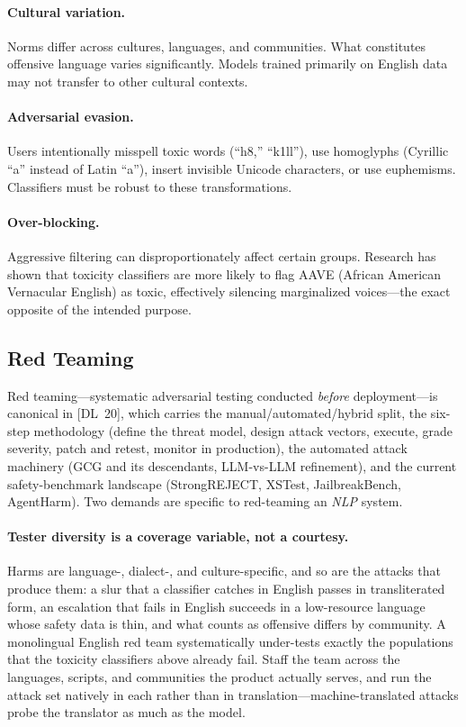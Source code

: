 \paragraph{Cultural variation.}
Norms differ across cultures, languages, and communities.  What constitutes
offensive language varies significantly.  Models trained primarily on English
data may not transfer to other cultural contexts.

\paragraph{Adversarial evasion.}
Users intentionally misspell toxic words (``h8,'' ``k1ll''), use homoglyphs
(Cyrillic ``a'' instead of Latin ``a''), insert invisible Unicode characters,
or use euphemisms.  Classifiers must be robust to these transformations.

\paragraph{Over-blocking.}
Aggressive filtering can disproportionately affect certain groups.  Research
has shown that toxicity classifiers are more likely to flag AAVE (African
American Vernacular English) as toxic, effectively silencing marginalized
voices---the exact opposite of the intended purpose.

\subsection{Red Teaming}
\label{sec:red_teaming}

Red teaming---systematic adversarial testing conducted \emph{before}
deployment---is canonical in [DL~20], which carries the
manual/automated/hybrid split, the six-step methodology (define the threat
model, design attack vectors, execute, grade severity, patch and retest,
monitor in production), the automated attack machinery (GCG and its
descendants, LLM-vs-LLM refinement), and the current safety-benchmark
landscape (StrongREJECT, XSTest, JailbreakBench, AgentHarm).  Two demands are
specific to red-teaming an \emph{NLP} system.

\paragraph{Tester diversity is a coverage variable, not a courtesy.}
Harms are language-, dialect-, and culture-specific, and so are the attacks
that produce them: a slur that a classifier catches in English passes in
transliterated form, an escalation that fails in English succeeds in a
low-resource language whose safety data is thin, and what counts as offensive
differs by community.  A monolingual English red team systematically
under-tests exactly the populations that the toxicity classifiers above
already fail.  Staff the team across the languages, scripts,
and communities the product actually serves, and run the attack set natively
in each rather than in translation---machine-translated attacks probe the
translator as much as the model.

